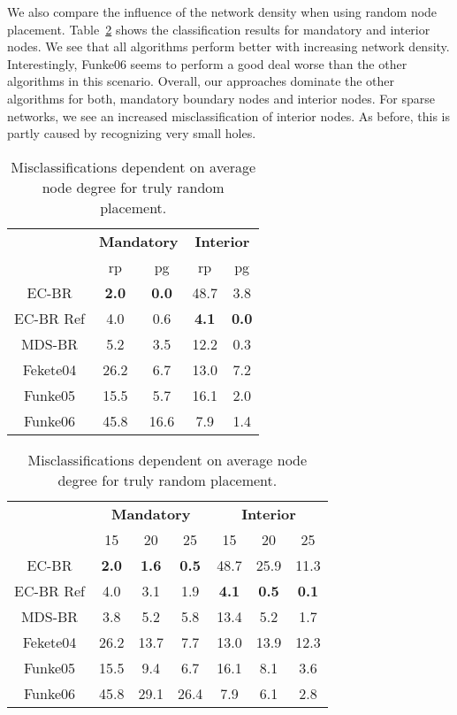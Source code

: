 \documentclass{llncs}
\begin{document}
We also compare the influence of the network density when using random node placement.
Table~\ref{tab:rp_mand_int} shows the classification results for mandatory and interior nodes.
We see that all algorithms perform better with increasing network density.
Interestingly, Funke06 seems to perform a good deal worse than the other algorithms in this scenario.
Overall, our approaches dominate the other algorithms for both, mandatory boundary nodes and interior nodes.
For sparse networks, we see an increased misclassification of interior nodes.
As before, this is partly caused by recognizing very small holes.

\begin{table}[t]
\begin{minipage}[t]{0.48\columnwidth}
\setlength\tabcolsep{5pt}
\centering
\caption{Misclassifications for random placement (rp) and perturbed grid placement (pg).}\label{tab:rp_pg}
\begin{tabular}{c||cc||cc}
& \multicolumn{2}{c||}{\bfseries Mandatory}& \multicolumn{2}{c}{\bfseries Interior} \\
 & rp & pg & rp & pg \\
\hline
EC-BR & \bfseries 2.0 & \bfseries 0.0 & 48.7 & 3.8  \\
EC-BR Ref & 4.0 & 0.6 & \bfseries 4.1 & \bfseries 0.0  \\
MDS-BR & 5.2 & 3.5 & 12.2 & 0.3 \\
\hline
Fekete04 & 26.2 & 6.7 & 13.0 & 7.2 \\
Funke05 & 15.5 & 5.7 & 16.1 & 2.0  \\
Funke06 & 45.8 & 16.6 & 7.9 & 1.4
\end{tabular}
\end{minipage}
\hfill
\begin{minipage}[t]{0.48\columnwidth}
\setlength\tabcolsep{5pt}
\centering
\caption{Misclassifications dependent on average node degree for truly random placement.}\label{tab:rp_mand_int}
\begin{tabular}{c||ccc||ccc}
& \multicolumn{3}{c||}{\bfseries Mandatory}& \multicolumn{3}{c}{\bfseries Interior} \\
 & 15 & 20 & 25 & 15 & 20 & 25 \\
\hline
EC-BR & \bfseries 2.0 & \bfseries 1.6 & \bfseries 0.5 & 48.7 & 25.9 & 11.3  \\
EC-BR Ref & 4.0 & 3.1 & 1.9 & \bfseries 4.1 & \bfseries 0.5 & \bfseries 0.1  \\
MDS-BR & 3.8 & 5.2 & 5.8 & 13.4 & 5.2 & 1.7  \\
\hline
Fekete04 & 26.2 & 13.7 & 7.7 & 13.0 & 13.9 & 12.3 \\
Funke05 & 15.5 & 9.4 & 6.7 & 16.1 & 8.1 & 3.6  \\
Funke06 & 45.8 & 29.1 & 26.4 & 7.9 & 6.1 & 2.8
\end{tabular}
\end{minipage}
\end{table}
\end{document}
